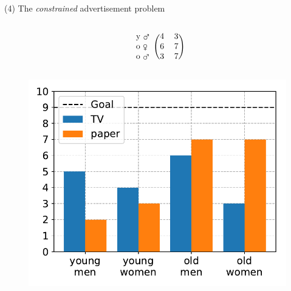 \documentclass[11pt, aspectratio=149]{beamer}
\theoremstyle{plain}
\begin{document}
\begin{frame}[fragile, t]{(4) The \emph{constrained} advertisement problem}
\begin{columns}
\begin{column}{0.4\textwidth}
\[\begin{blockarray}{rcc}
\begin{block}{l(cc)}
			\text{y \mars}  & 4 &  3 \\
			\text{o \female}  & 6 &  7 \\
			\text{o \mars}  & 3 &  7 \\
			\end{block}
			\end{blockarray}
			\]
			\vspace*{-3em}
			\begin{figure}
				\centering
				\includegraphics[width=1.0\linewidth]{figs/advertisement_statement.pdf}
			\end{figure}
		\end{column}
	\end{columns}
\end{frame}
\end{document}
